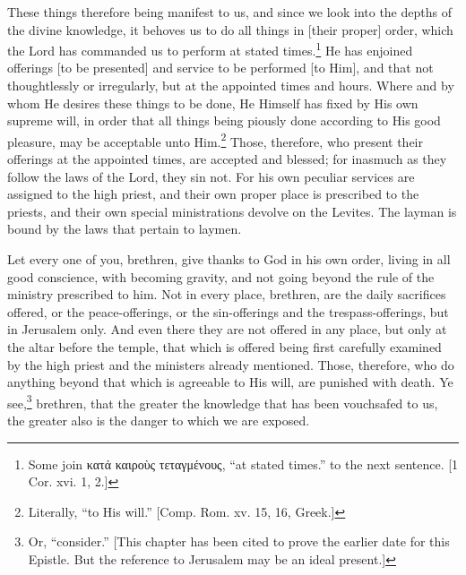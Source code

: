 
These things therefore being manifest to us, and since we look into the depths of the divine knowledge, it behoves us to do all things in [their proper] order, which the Lord has commanded us to perform at stated times.\footnote{Some join \textgreek{κατά καιροὺς τεταγμένους}, “at stated times.” to the next sentence. [1 Cor. xvi. 1, 2.]} He has enjoined offerings [to be presented] and service to be performed [to Him], and that not thoughtlessly or irregularly, but at the appointed times and hours. Where and by whom He desires these things to be done, He Himself has fixed by His own supreme will, in order that all things being piously done according to His good pleasure, may be acceptable unto Him.\footnote{Literally, “to His will.” [Comp. Rom. xv. 15, 16, Greek.]} Those, therefore, who present their offerings at the appointed times, are accepted and blessed; for inasmuch as they follow the laws of the Lord, they sin not. For his own peculiar services are assigned to the high priest, and their own proper place is prescribed to the priests, and their own special ministrations devolve on the Levites. The layman is bound by the laws that pertain to laymen.


Let every one of you, brethren, give thanks to God in his own order, living in all good conscience, with becoming gravity, and not going beyond the rule of the ministry prescribed to him. Not in every place, brethren, are the daily sacrifices offered, or the peace-offerings, or the sin-offerings and the trespass-offerings, but in Jerusalem only. And even there they are not offered in any place, but only at the altar before the temple, that which is offered being first carefully examined by the high priest and the ministers already mentioned. Those, therefore, who do anything beyond that which is agreeable to His will, are punished with death. Ye see,\footnote{Or, “consider.” [This chapter has been cited to prove the earlier date for this Epistle. But the reference to Jerusalem may be an ideal present.]} brethren, that the greater the knowledge that has been vouchsafed to us, the greater also is the danger to which we are exposed.


